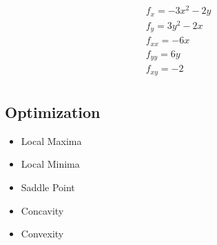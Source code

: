 \documentclass[12pt, a4paper]{article}
\begin{document}
\begin{eqnarray}
f_x = -3x^2 -2y \\ \nonumber
f_y = 3y^2 -2x \\ \nonumber
f_{xx} = -6x \\ \nonumber
f_{yy} = 6y \\ \nonumber
f_{xy} =-2 \\ \nonumber
\end{eqnarray}

\subsection*{Optimization}

\begin{itemize}
\item Local Maxima
\item Local Minima
\item Saddle Point
\item Concavity
\item Convexity
\end{itemize}
\end{document}

